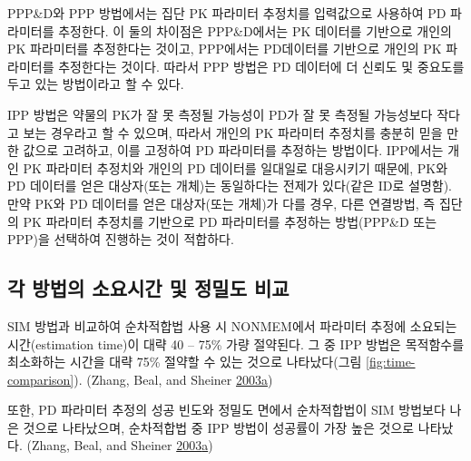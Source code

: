 \documentclass[
  10pt,
  krantz2,
  a4paper]{krantz}
\theoremstyle{definition}
\theoremstyle{definition}
\theoremstyle{definition}
\theoremstyle{remark}
\begin{document}
PPP\&D와 PPP 방법에서는 집단 PK 파라미터 추정치를 입력값으로 사용하여 PD 파라미터를 추정한다. 이 둘의 차이점은 PPP\&D에서는 PK 데이터를 기반으로 개인의 PK 파라미터를 추정한다는 것이고, PPP에서는 PD데이터를 기반으로 개인의 PK 파라미터를 추정한다는 것이다. 따라서 PPP 방법은 PD 데이터에 더 신뢰도 및 중요도를 두고 있는 방법이라고 할 수 있다.

IPP 방법은 약물의 PK가 잘 못 측정될 가능성이 PD가 잘 못 측정될 가능성보다 작다고 보는 경우라고 할 수 있으며, 따라서 개인의 PK 파라미터 추정치를 충분히 믿을 만한 값으로 고려하고, 이를 고정하여 PD 파라미터를 추정하는 방법이다. IPP에서는 개인 PK 파라미터 추정치와 개인의 PD 데이터를 일대일로 대응시키기 때문에, PK와 PD 데이터를 얻은 대상자(또는 개체)는 동일하다는 전제가 있다(같은 ID로 설명함). 만약 PK와 PD 데이터를 얻은 대상자(또는 개체)가 다를 경우, 다른 연결방법, 즉 집단의 PK 파라미터 추정치를 기반으로 PD 파라미터를 추정하는 방법(PPP\&D 또는 PPP)을 선택하여 진행하는 것이 적합하다.

\hypertarget{uxac01-uxbc29uxbc95uxc758-uxc18cuxc694uxc2dcuxac04-uxbc0f-uxc815uxbc00uxb3c4-uxbe44uxad50}{%
\subsection{각 방법의 소요시간 및 정밀도 비교}\label{uxac01-uxbc29uxbc95uxc758-uxc18cuxc694uxc2dcuxac04-uxbc0f-uxc815uxbc00uxb3c4-uxbe44uxad50}}

SIM 방법과 비교하여 순차적합법 사용 시 NONMEM에서 파라미터 추정에 소요되는 시간(estimation time)이 대략 40 -- 75\% 가량 절약된다. 그 중 IPP 방법은 목적함수를 최소화하는 시간을 대략 75\% 절약할 수 있는 것으로 나타났다(그림 \ref{fig:time-comparison}). (Zhang, Beal, and Sheiner \protect\hyperlink{ref-zhang1}{2003}\protect\hyperlink{ref-zhang1}{a}) 

또한, PD 파라미터 추정의 성공 빈도와 정밀도 면에서 순차적합법이 SIM 방법보다 나은 것으로 나타났으며, 순차적합법 중 IPP
방법이 성공률이 가장 높은 것으로 나타났다. (Zhang, Beal, and Sheiner \protect\hyperlink{ref-zhang1}{2003}\protect\hyperlink{ref-zhang1}{a})
\end{document}
